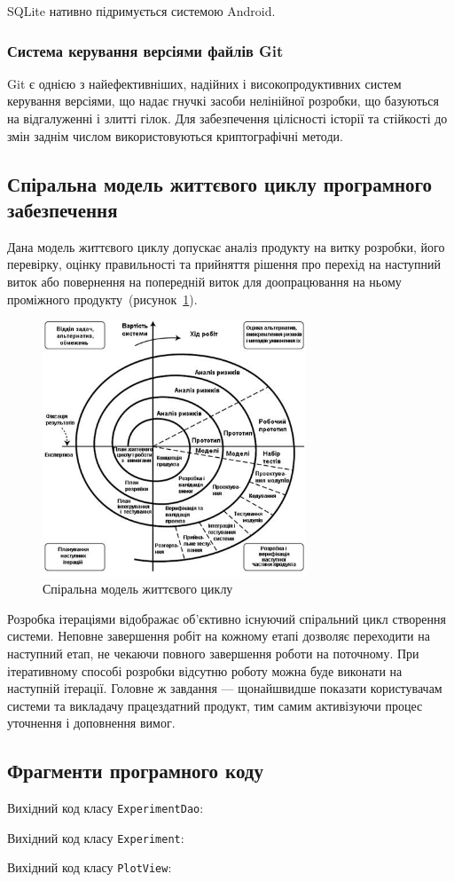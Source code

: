 SQLite нативно підримується системою Android.

\subsubsection{Система керування версіями файлів Git}
Git є однією з найефективніших, надійних і високопродуктивних систем керування версіями, що надає гнучкі засоби нелінійної розробки, що базуються на відгалуженні і злитті гілок. 
Для забезпечення цілісності історії та стійкості до змін заднім числом використовуються криптографічні методи.

\subsection{Спіральна модель життєвого циклу програмного забезпечення}
Дана модель життєвого циклу допускає аналіз продукту на витку розробки, його перевірку, оцінку правильності та прийняття рішення про перехід на наступний виток або повернення на попередній виток для доопрацювання на ньому проміжного продукту~(рисунок~\ref{fig:spiral_model}).

\begin{figure}[H]
  \centering
    \includegraphics[width=0.7\textwidth]{spiral_model}
  \caption{Спіральна модель життєвого циклу}
  \label{fig:spiral_model}
\end{figure}

Розробка ітераціями відображає об'єктивно існуючий спіральний цикл створення системи. 
Неповне завершення робіт на кожному етапі дозволяє переходити на наступний етап, не чекаючи повного завершення роботи на поточному. 
При ітеративному способі розробки відсутню роботу можна буде виконати на наступній ітерації. 
Головне ж завдання --- щонайшвидше показати користувачам системи та викладачу працездатний продукт, тим самим активізуючи процес уточнення і доповнення вимог.

\subsection{Фрагменти програмного коду}
Вихідний код класу \texttt{ExperimentDao}:


Вихідний код класу \texttt{Experiment}:


Вихідний код класу \texttt{PlotView}:



